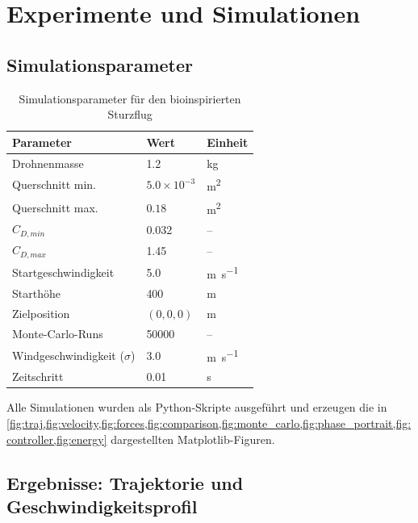 ﻿\documentclass[12pt,a4paper]{article}
\theoremstyle{remark}
\begin{document}
	\section{Experimente und Simulationen}
	\label{sec:experimente}
	
	\subsection{Simulationsparameter}
	
	\begin{table}[H]
		\centering
		\caption{Simulationsparameter für den bioinspirierten Sturzflug}
		\label{tab:simparams}
		\begin{tabular}{lll}
			\toprule
			\textbf{Parameter} & \textbf{Wert} & \textbf{Einheit} \\
			\midrule
			Drohnenmasse & 1.2 & \si{\kg} \\
			Querschnitt min. & $5.0 \times 10^{-3}$ & \si{\m^2} \\
			Querschnitt max. & $0.18$ & \si{\m^2} \\
			$C_{D,min}$ & 0.032 & -- \\
			$C_{D,max}$ & 1.45 & -- \\
			Startgeschwindigkeit & 5.0 & \si{\m\per\second} \\
			Starthöhe & 400 & \si{\m} \\
			Zielposition & $(0, 0, 0)$ & \si{\m} \\
			Monte-Carlo-Runs & 50000 & -- \\
			Windgeschwindigkeit ($\sigma$) & 3.0 & \si{\m\per\second} \\
			Zeitschritt & 0.01 & \si{\second} \\
			\bottomrule
		\end{tabular}
	\end{table}
	
	Alle Simulationen wurden als Python-Skripte ausgeführt und erzeugen die in \cref{fig:traj,fig:velocity,fig:forces,fig:comparison,fig:monte_carlo,fig:phase_portrait,fig:controller,fig:energy} dargestellten Matplotlib-Figuren.
	
	\subsection{Ergebnisse: Trajektorie und Geschwindigkeitsprofil}
	
\end{document}
